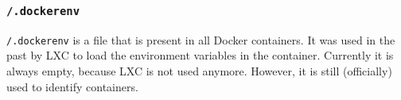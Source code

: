 \subsubsection{\texorpdfstring{\lstinline{/.dockerenv}}{/.dockerenv}}
\lstinline{/.dockerenv} is a file that is present in all Docker containers. It was used in the past by LXC to load the environment variables in the container. Currently it is always empty, because LXC is not used anymore. However, it is still (officially) used to identify containers\cite{Metasploit-Linux-Gather-Container-Detection}\cite{Removed-Dockerinit-Reference}.
